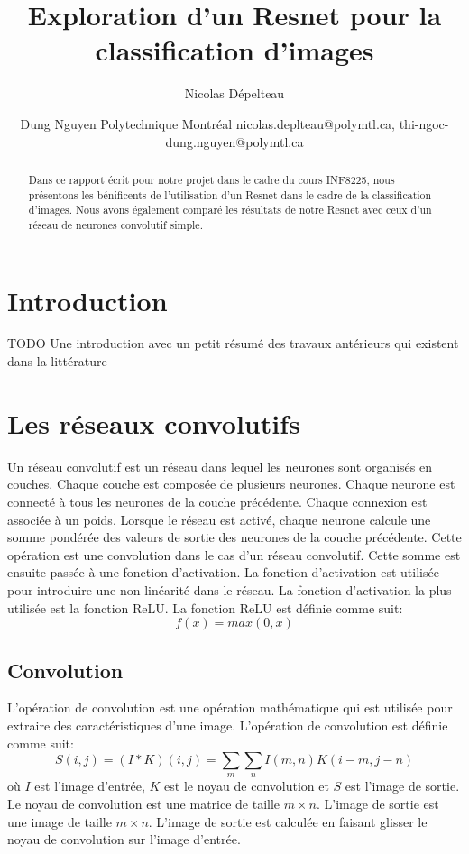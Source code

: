 \documentclass{article}
\title{Exploration d'un Resnet pour la classification d'images}
\author{
Nicolas Dépelteau
\and
Dung Nguyen
\affiliations
Polytechnique Montréal
\emails
nicolas.deplteau@polymtl.ca,
thi-ngoc-dung.nguyen@polymtl.ca

}
\begin{document}
\maketitle

\begin{abstract}
    Dans ce rapport écrit pour notre projet dans le cadre du cours INF8225,
    nous présentons les bénificents de l'utilisation
    d'un Resnet dans le cadre de la classification d'images. Nous avons également comparé les
    résultats de notre Resnet avec ceux d'un réseau de neurones convolutif simple. 
\end{abstract}

\section{Introduction}

TODO Une introduction avec un petit résumé des travaux antérieurs qui existent dans la littérature

\section{Les réseaux convolutifs}
Un réseau convolutif est un réseau dans lequel les neurones sont organisés en couches.
Chaque couche est composée de plusieurs neurones. Chaque neurone est connecté à tous les neurones de la couche précédente.
Chaque connexion est associée à un poids. Lorsque le réseau est activé, chaque neurone calcule une somme
pondérée des valeurs de sortie des neurones de la couche précédente.
Cette opération est une convolution dans le cas d'un réseau convolutif.
Cette somme est ensuite passée à une fonction d'activation.
La fonction d'activation est utilisée pour introduire une non-linéarité dans le réseau.
La fonction d'activation la plus utilisée est la fonction ReLU. La fonction ReLU est définie comme suit:
\begin{equation}
    f(x) = max(0, x)
\end{equation}

\subsection{Convolution}
L'opération de convolution est une opération mathématique qui est utilisée pour extraire des caractéristiques d'une image.
L'opération de convolution est définie comme suit:
\begin{equation}
    S(i, j) = (I * K)(i, j) = \sum_{m} \sum_{n} I(m, n)K(i - m, j - n)
\end{equation}
où $I$ est l'image d'entrée, $K$ est le noyau de convolution et $S$ est l'image de sortie.
Le noyau de convolution est une matrice de taille $m \times n$.
L'image de sortie est une image de taille $m \times n$.
L'image de sortie est calculée en faisant glisser le noyau de convolution sur l'image d'entrée.
\end{document}
